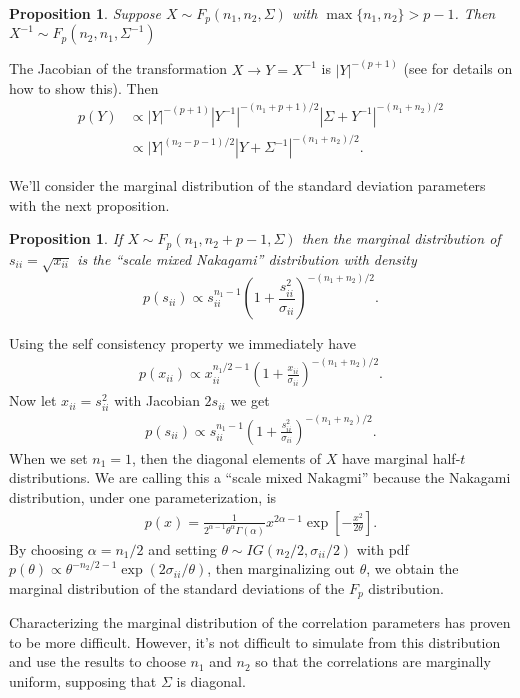 \documentclass{article}\usepackage[]{graphicx}\usepackage[]{color}
\newtheorem{prop}[thm]{Proposition}
\begin{document}
\begin{prop}\label{prop:invF}
Suppose $X\sim F_p(n_1, n_2, \Sigma)$ with $\max\{n_1,n_2\}>p-1$. Then $X^{-1}\sim F_p(n_2, n_1, \Sigma^{-1})$
\end{prop}
The Jacobian of the transformation $X\to Y=X^{-1}$ is $|Y|^{-(p+1)}$ (see \cite{mathai1997jacobians} for details on how to show this). Then 
\begin{align*}
  p(Y) &\propto |Y|^{-(p+1)}|Y^{-1}|^{-(n_1 + p + 1)/2}|\Sigma + Y^{-1}|^{-(n_1 + n_2)/2}\\
  &\propto |Y|^{(n_2 - p - 1)/2}|Y + \Sigma^{-1}|^{-(n_1 + n_2)/2}.
\end{align*}

We'll consider the marginal distribution of the standard deviation parameters with the next proposition.
\begin{prop}\label{prop:sd}
 If $X\sim F_p(n_1, n_2 + p - 1, \Sigma)$ then the marginal distribution of $s_{ii}=\sqrt{x_{ii}}$ is the ``scale mixed Nakagami'' distribution with density
  \[
    p(s_{ii})\propto s_{ii}^{n_1 - 1}\left(1 + \frac{s_{ii}^2}{\sigma_{ii}}\right)^{-(n_1 + n_2)/2}.
  \]
\end{prop}
Using the self consistency property we immediately have
\begin{align*}
  p(x_{ii})\propto x_{ii}^{n_1/2 - 1}\left(1 + \frac{x_{ii}}{\sigma_{ii}}\right)^{-(n_1 + n_2)/2}.
\end{align*}
Now let $x_{ii}=s_{ii}^2$ with Jacobian $2s_{ii}$ we get
\begin{align*}
  p(s_{ii})\propto s_{ii}^{n_1 - 1}\left(1 + \frac{s_{ii}^2}{\sigma_{ii}}\right)^{-(n_1 + n_2)/2}.
\end{align*}
When we set $n_1=1$, then the diagonal elements of $X$ have marginal half-$t$ distributions. We are calling this a ``scale mixed Nakagmi'' because the Nakagami distribution, under one parameterization, is
\begin{align*}
  p(x) = \frac{1}{2^{\alpha - 1}\theta^\alpha \Gamma(\alpha)}x^{2\alpha -1}\exp\left[-\frac{x^2}{2\theta}\right].
\end{align*}
By choosing $\alpha=n_1/2$ and setting $\theta \sim IG(n_2/2, \sigma_{ii}/2)$ with pdf $p(\theta) \propto \theta^{-n_2/2 - 1}\exp(2\sigma_{ii}/\theta)$, then marginalizing out $\theta$, we obtain the marginal distribution of the standard deviations of the $F_p$ distribution.

Characterizing the marginal distribution of the correlation parameters has proven to be more difficult. However, it's not difficult to simulate from this distribution and use the results to choose $n_1$ and $n_2$ so that the correlations are marginally uniform, supposing that $\Sigma$ is diagonal. 
\end{document}
